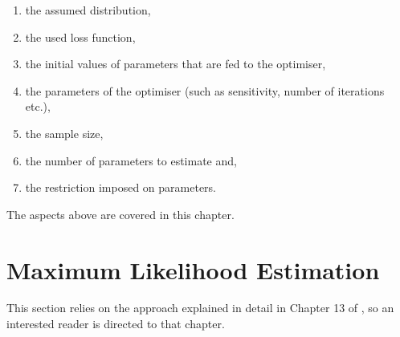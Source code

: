\documentclass[]{book}
\providecommand{\tightlist}{%
  \setlength{\itemsep}{0pt}\setlength{\parskip}{0pt}}
\theoremstyle{definition}
\theoremstyle{definition}
\theoremstyle{definition}
\theoremstyle{definition}
\theoremstyle{remark}
\begin{document}
\begin{enumerate}
\def\labelenumi{\arabic{enumi}.}
\tightlist
\item
  the assumed distribution,
\item
  the used loss function,
\item
  the initial values of parameters that are fed to the optimiser,
\item
  the parameters of the optimiser (such as sensitivity, number of iterations etc.),
\item
  the sample size,
\item
  the number of parameters to estimate and,
\item
  the restriction imposed on parameters.
\end{enumerate}

The aspects above are covered in this chapter.

\hypertarget{ADAMETSEstimationLikelihood}{%
\section{Maximum Likelihood Estimation}\label{ADAMETSEstimationLikelihood}}

This section relies on the approach explained in detail in Chapter 13 of \citet{SvetunkovSBA}, so an interested reader is directed to that chapter.
\end{document}
